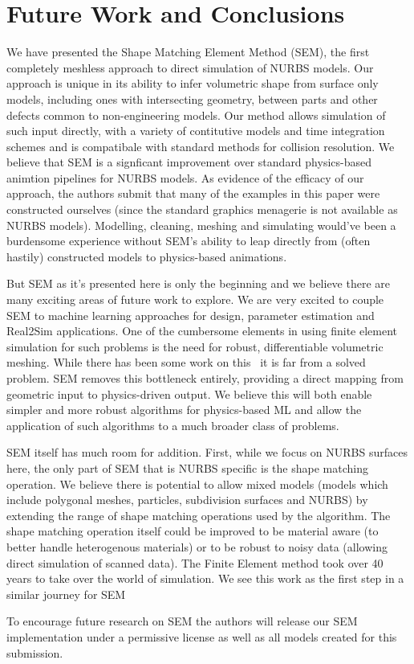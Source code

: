 \section{Future Work and Conclusions}

We have presented the Shape Matching Element Method (SEM), the first completely meshless approach to direct simulation of NURBS models.
Our approach is unique in its ability to infer volumetric shape from surface only models,
including ones with intersecting geometry, between parts and other defects common to non-engineering models.
Our method allows simulation of such input directly, with a variety of contitutive models and time integration schemes
and is compatibale with standard methods for collision resolution. 
We believe that SEM is a signficant improvement over standard physics-based animtion pipelines for NURBS models. 
As evidence of the efficacy of our approach, the authors submit that many of the examples in this paper were constructed ourselves
(since the standard graphics menagerie is not available as NURBS models). 
Modelling, cleaning, meshing and simulating would've been a burdensome experience without SEM's
ability to leap directly from (often hastily) constructed models to physics-based animations.

But SEM as it's presented here is only the beginning and we believe there are many exciting areas of future work to explore.
We are very excited to couple SEM to machine learning approaches for design, parameter estimation and Real2Sim applications.
One of the cumbersome elements in using finite element simulation for such problems is the need for robust, differentiable volumetric meshing.
While there has been some work on this~ it is far from a solved problem.
SEM removes this bottleneck entirely, providing a direct mapping from geometric input to physics-driven output. 
We believe this will both enable simpler and more robust algorithms for  physics-based ML and 
allow the application of such algorithms to a much broader class of problems. 

SEM itself has much room for addition.
First, while we focus on NURBS surfaces here, the only part of SEM that is NURBS specific is the shape matching operation.
We believe there is potential to allow mixed models (models which include polygonal meshes, particles, subdivision surfaces and NURBS)
by extending the range of shape matching operations used by the algorithm. The shape matching operation itself could be improved to be material aware 
(to better handle heterogenous materials) or to be robust to noisy data (allowing direct simulation of scanned data). The Finite Element method took over 
40 years to take over the world of simulation. 
We see this work as the first step in a similar journey for SEM

To encourage future research on SEM the authors will release our SEM implementation under a permissive license as well as all models created for this submission.
